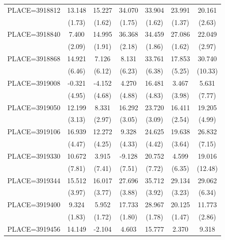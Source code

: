 {\begin{tabular}{l*{6}{c}}
PLACE=3918812       &      13.148&      15.227&      34.070&      33.904&      23.991&      20.161\\
                    &      (1.73)&      (1.62)&      (1.75)&      (1.62)&      (1.37)&      (2.63)\\
PLACE=3918840       &       7.400&      14.995&      36.368&      34.459&      27.086&      22.049\\
                    &      (2.09)&      (1.91)&      (2.18)&      (1.86)&      (1.62)&      (2.97)\\
PLACE=3918868       &      14.921&       7.126&       8.131&      33.761&      17.853&      30.740\\
                    &      (6.46)&      (6.12)&      (6.23)&      (6.38)&      (5.25)&     (10.33)\\
PLACE=3919008       &      -0.321&      -4.152&       4.270&      16.481&       3.467&       5.631\\
                    &      (4.95)&      (4.68)&      (4.88)&      (4.83)&      (3.98)&      (7.77)\\
PLACE=3919050       &      12.199&       8.331&      16.292&      23.720&      16.411&      19.205\\
                    &      (3.13)&      (2.97)&      (3.05)&      (3.09)&      (2.54)&      (4.99)\\
PLACE=3919106       &      16.939&      12.272&       9.328&      24.625&      19.638&      26.832\\
                    &      (4.47)&      (4.25)&      (4.33)&      (4.42)&      (3.64)&      (7.15)\\
PLACE=3919330       &      10.672&       3.915&      -9.128&      20.752&       4.599&      19.016\\
                    &      (7.81)&      (7.41)&      (7.51)&      (7.72)&      (6.35)&     (12.48)\\
PLACE=3919344       &      15.512&      16.017&      27.696&      35.712&      29.134&      29.062\\
                    &      (3.97)&      (3.77)&      (3.88)&      (3.92)&      (3.23)&      (6.34)\\
PLACE=3919400       &       9.324&       5.952&      17.733&      28.967&      20.125&      11.773\\
                    &      (1.83)&      (1.72)&      (1.80)&      (1.78)&      (1.47)&      (2.86)\\
PLACE=3919456       &      14.149&      -2.104&       4.603&      15.777&       2.370&       9.318\\

\end{tabular}}
